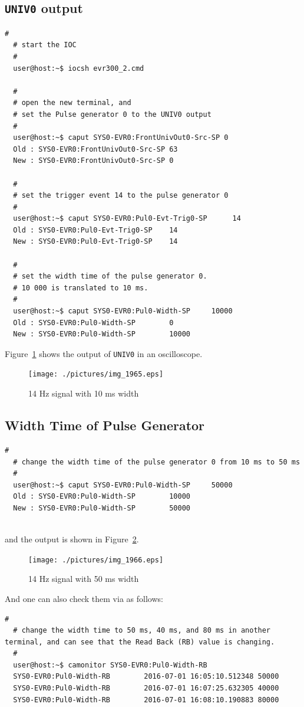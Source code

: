 \documentclass[11pt
  , a4paper
  , article
  , oneside
  , showtrims
]{memoir}
\begin{document}
\subsection{\texttt{UNIV0} output}
\begin{lstlisting}[style=termstyle]
  #
  # start the IOC
  #
  user@host:~$ iocsh evr300_2.cmd

  #
  # open the new terminal, and 
  # set the Pulse generator 0 to the UNIV0 output
  # 
  user@host:~$ caput SYS0-EVR0:FrontUnivOut0-Src-SP 0
  Old : SYS0-EVR0:FrontUnivOut0-Src-SP 63
  New : SYS0-EVR0:FrontUnivOut0-Src-SP 0

  #
  # set the trigger event 14 to the pulse generator 0
  #
  user@host:~$ caput SYS0-EVR0:Pul0-Evt-Trig0-SP      14
  Old : SYS0-EVR0:Pul0-Evt-Trig0-SP    14
  New : SYS0-EVR0:Pul0-Evt-Trig0-SP    14

  #
  # set the width time of the pulse generator 0.
  # 10 000 is translated to 10 ms.
  #
  user@host:~$ caput SYS0-EVR0:Pul0-Width-SP     10000
  Old : SYS0-EVR0:Pul0-Width-SP        0
  New : SYS0-EVR0:Pul0-Width-SP        10000
\end{lstlisting}
Figure~\ref{fig:14Hz} shows the output of \texttt{UNIV0} in an oscilloscope. 
\begin{figure}[!ht]
  \centering
    \texttt{[image: ./pictures/img\_1965.eps]}
  \caption{14 Hz signal with 10 ms width}
  \label{fig:14Hz}
\end{figure}


\subsection{Width Time of Pulse Generator}

\begin{lstlisting}[style=termstyle]
  #
  # change the width time of the pulse generator 0 from 10 ms to 50 ms
  #
  user@host:~$ caput SYS0-EVR0:Pul0-Width-SP     50000
  Old : SYS0-EVR0:Pul0-Width-SP        10000
  New : SYS0-EVR0:Pul0-Width-SP        50000
  
\end{lstlisting}
and the output is shown in Figure~\ref{fig:50ms}.
\begin{figure}[!ht]
  \centering
    \texttt{[image: ./pictures/img\_1966.eps]}
  \caption{14 Hz signal with 50 ms width}
  \label{fig:50ms}
\end{figure}

And one can also check them via  as follows:
\begin{lstlisting}[style=termstyle]
  #
  # change the width time to 50 ms, 40 ms, and 80 ms in another terminal, and can see that the Read Back (RB) value is changing.
  #
  user@host:~$ camonitor SYS0-EVR0:Pul0-Width-RB
  SYS0-EVR0:Pul0-Width-RB        2016-07-01 16:05:10.512348 50000
  SYS0-EVR0:Pul0-Width-RB        2016-07-01 16:07:25.632305 40000
  SYS0-EVR0:Pul0-Width-RB        2016-07-01 16:08:10.190883 80000
  
\end{lstlisting}
\end{document}

